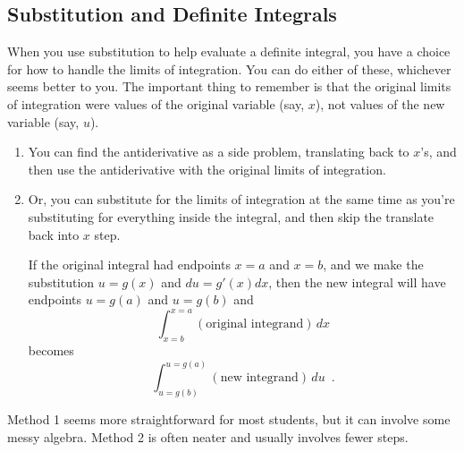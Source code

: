 \subsection{Substitution and Definite Integrals}
When you use substitution to help evaluate a definite integral, you have a choice for how to handle the limits of integration. You can do either of these, whichever seems better to you. The important thing to remember is that the original limits of integration were values of the original variable (say, $x$), not values of the new variable (say, $u$).
  \begin{enumerate}
    \item You can find the antiderivative as a side problem, translating back to $x$’s, and then use the antiderivative with the original limits of integration.
    \item Or, you can substitute for the limits of integration at the same time as you’re substituting for everything inside the integral, and then skip the translate back into $x$ step.

    If the original integral had endpoints $x=a$ and $x=b$, and we make the substitution $u=g(x)$ and $du=g'(x)dx$, then the new integral will have endpoints $u=g(a)$ and $u=g(b)$ and
    $$\int_{x=b}^{x=a}(\text{original integrand})\,dx$$
    becomes
    $$\int_{u=g(b)}^{u=g(a)}(\text{new integrand})\,du \enspace .$$
    \end{enumerate}
Method 1 seems more straightforward for most students, but it can involve some messy algebra. Method 2 is often neater and usually involves fewer steps.

